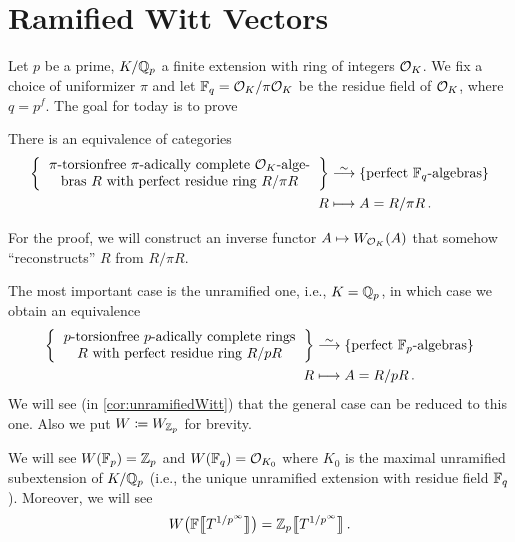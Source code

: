 \documentclass[a4paper, 10pt, oneside, DIV=9, chapterprefix=true, numbers=enddot,bibliography=totoc]{scrbook}
\begin{document}
\section{Ramified Witt Vectors}
Let $p$ be a prime, $K/\mathbb{Q}_p$ a finite extension with ring of integers $\mathcal{O}_K$. We fix a choice of uniformizer $\pi$ and let $\mathbb{F}_q=\mathcal{O}_K/\pi\mathcal{O}_K$ be the residue field of $\mathcal{O}_K$, where $q=p^f$. The goal for today is to prove
\begin{prop}\label{prop:FqAlgebrasEquivalence}
	There is an equivalence of categories
	\begin{align*}
		\left\{\begin{tabular}{c}
			$\pi$-torsionfree $\pi$-adically complete $\Oo_K$-alge-\\
			bras $R$ with perfect residue ring $R/\pi R$
		\end{tabular}
		\right\}&\isomorphism\left\{\text{perfect $\IF_q$-algebras}\right\}\\
		R&\longmapsto A=R/\pi R\,.
	\end{align*}
\end{prop}
For the proof, we will construct an inverse functor $A\mapsto W_{\mathcal{O}_K}(A)$ that somehow \enquote{reconstructs} $R$ from $R/\pi R$.
\begin{rem}
	The most important case is the unramified one, i.e., $K=\mathbb{Q}_p$, in which case we obtain an equivalence
	\begin{align*}
	\left\{\begin{tabular}{c}
	$p$-torsionfree $p$-adically complete rings\\
	$R$ with perfect residue ring $R/pR$
	\end{tabular}
	\right\}&\isomorphism\left\{\text{perfect $\IF_p$-algebras}\right\}\\
	R&\longmapsto A=R/p R\,.
	\end{align*}
	We will see (in \cref{cor:unramifiedWitt}) that the general case can be reduced to this one. Also we put $W\coloneqq W_{\mathbb{Z}_p}$ for brevity.
\end{rem}
We will see $W(\mathbb{F}_p)=\mathbb{Z}_p$ and $W(\mathbb{F}_q)=\mathcal{O}_{K_0}$ where $K_0$ is the maximal unramified subextension of $K/\mathbb{Q}_p$ (i.e., the unique unramified extension with residue field $\mathbb{F}_q$). Moreover, we will see
	\begin{equation*}
		W\big(\mathbb{F}\big\llbracket T^{1/p^\infty}\big\rrbracket\big)=\mathbb{Z}_p\big\llbracket T^{1/p^\infty}\big\rrbracket\,.
	\end{equation*}
	
\end{document}
